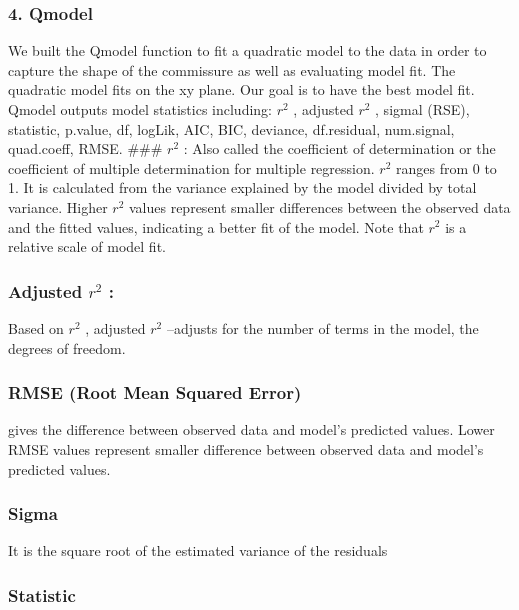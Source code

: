 \documentclass[10pt,letterpaper]{article}
\begin{document}
\subsubsection{4. Qmodel}\label{qmodel}

We built the Qmodel function to fit a quadratic model to the data in
order to capture the shape of the commissure as well as evaluating model
fit. The quadratic model fits on the xy plane. Our goal is to have the
best model fit. Qmodel outputs model statistics including: \(r^2\) ,
adjusted \(r^2\) , sigmal (RSE), statistic, p.value, df, logLik, AIC,
BIC, deviance, df.residual, num.signal, quad.coeff, RMSE. \#\#\# \(r^2\)
: Also called the coefficient of determination or the coefficient of
multiple determination for multiple regression. \(r^2\) ranges from 0 to
1. It is calculated from the variance explained by the model divided by
total variance. Higher \(r^2\) values represent smaller differences
between the observed data and the fitted values, indicating a better fit
of the model. Note that \(r^2\) is a relative scale of model fit.

\subsubsection{\texorpdfstring{Adjusted \(r^2\)
:}{Adjusted r\^{}2 :}}\label{adjusted-r2}

Based on \(r^2\) , adjusted \(r^2\) --adjusts for the number of terms in
the model, the degrees of freedom.

\subsubsection{RMSE (Root Mean Squared
Error)}\label{rmse-root-mean-squared-error}

gives the difference between observed data and model's predicted values.
Lower RMSE values represent smaller difference between observed data and
model's predicted values.

\subsubsection{Sigma}\label{sigma}

It is the square root of the estimated variance of the residuals

\subsubsection{Statistic}\label{statistic}
\end{document}
